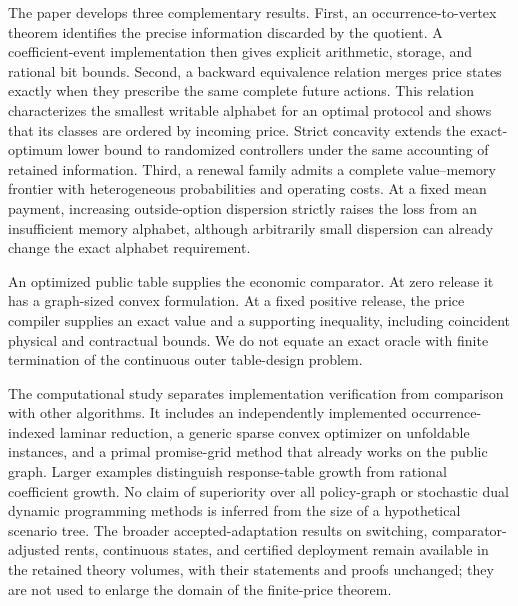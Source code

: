 The paper develops three complementary results. First, an occurrence-to-vertex theorem identifies the precise information discarded by the quotient. A coefficient-event implementation then gives explicit arithmetic, storage, and rational bit bounds. Second, a backward equivalence relation merges price states exactly when they prescribe the same complete future actions. This relation characterizes the smallest writable alphabet for an optimal protocol and shows that its classes are ordered by incoming price. Strict concavity extends the exact-optimum lower bound to randomized controllers under the same accounting of retained information. Third, a renewal family admits a complete value--memory frontier with heterogeneous probabilities and operating costs. At a fixed mean payment, increasing outside-option dispersion strictly raises the loss from an insufficient memory alphabet, although arbitrarily small dispersion can already change the exact alphabet requirement.

An optimized public table supplies the economic comparator. At zero release it has a graph-sized convex formulation. At a fixed positive release, the price compiler supplies an exact value and a supporting inequality, including coincident physical and contractual bounds. We do not equate an exact oracle with finite termination of the continuous outer table-design problem.

The computational study separates implementation verification from comparison with other algorithms. It includes an independently implemented occurrence-indexed laminar reduction, a generic sparse convex optimizer on unfoldable instances, and a primal promise-grid method that already works on the public graph. Larger examples distinguish response-table growth from rational coefficient growth. No claim of superiority over all policy-graph or stochastic dual dynamic programming methods is inferred from the size of a hypothetical scenario tree. The broader accepted-adaptation results on switching, comparator-adjusted rents, continuous states, and certified deployment remain available in the retained theory volumes, with their statements and proofs unchanged; they are not used to enlarge the domain of the finite-price theorem.
